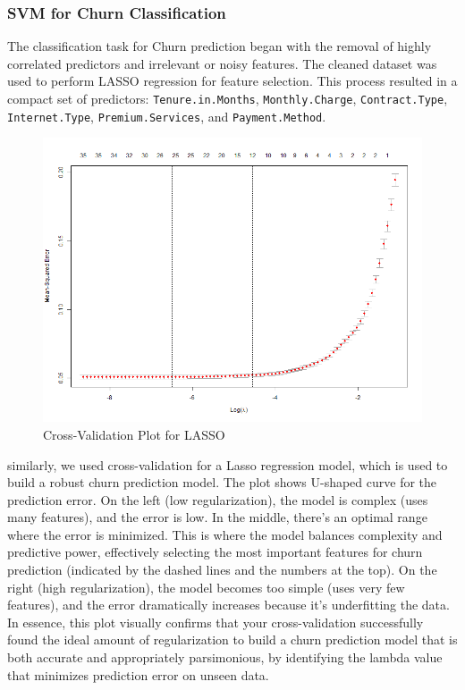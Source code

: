 \documentclass[
]{article}
\begin{document}
\hypertarget{svm-for-churn-classification}{%
\subsubsection{SVM for Churn
Classification}\label{svm-for-churn-classification}}

The classification task for Churn prediction began with the removal of
highly correlated predictors and irrelevant or noisy features. The
cleaned dataset was used to perform LASSO regression for feature
selection. This process resulted in a compact set of predictors:
\texttt{Tenure.in.Months}, \texttt{Monthly.Charge},
\texttt{Contract.Type}, \texttt{Internet.Type},
\texttt{Premium.Services}, and \texttt{Payment.Method}.

\begin{figure}

{\centering \includegraphics[width=0.85\linewidth]{Plots/lasso_cv_plot} 

}

\caption{Cross-Validation Plot for LASSO}\label{fig:lasso-cv-plot-img}
\end{figure}

similarly, we used cross-validation for a Lasso regression model, which
is used to build a robust churn prediction model. The plot shows
U-shaped curve for the prediction error. On the left (low
regularization), the model is complex (uses many features), and the
error is low. In the middle, there's an optimal range where the error is
minimized. This is where the model balances complexity and predictive
power, effectively selecting the most important features for churn
prediction (indicated by the dashed lines and the numbers at the top).
On the right (high regularization), the model becomes too simple (uses
very few features), and the error dramatically increases because it's
underfitting the data. In essence, this plot visually confirms that your
cross-validation successfully found the ideal amount of regularization
to build a churn prediction model that is both accurate and
appropriately parsimonious, by identifying the lambda value that
minimizes prediction error on unseen data.
\end{document}

